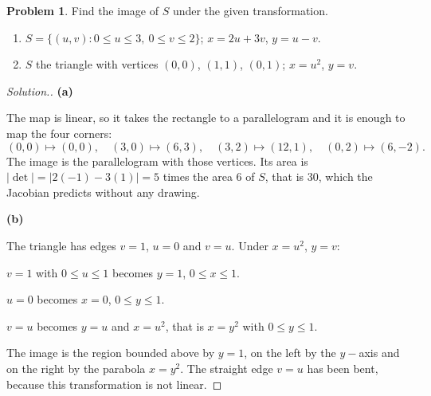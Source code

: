 \documentclass[11pt,a4paper]{article}
\theoremstyle{definition}
\newtheorem{problemx}{Problem}[subsection]
\newenvironment{problem}{\begin{problemx}}{\end{problemx}}
\newenvironment{solution}
  {\renewcommand{\qedsymbol}{}\begin{proof}[\textit{Solution}.]}
  {\end{proof}}
\newcommand{\subhead}[1]{%
  \par\medskip\noindent\textbf{#1}\par\nobreak\smallskip}
\begin{document}
\begin{problem}
Find the image of $S$ under the given transformation.
\begin{enumerate}
\item[(a)] $S = \{(u,v): 0\leq u\leq 3,\ 0\leq v\leq 2\}$;
$x = 2u+3v$, $y = u-v$.
\item[(b)] $S$ the triangle with vertices $(0,0)$, $(1,1)$, $(0,1)$;
$x = u^2$, $y = v$.
\end{enumerate}
\end{problem}
\begin{solution}
\subhead{(a)}
The map is linear, so it takes the rectangle to a parallelogram and it is enough
to map the four corners:
$$(0,0)\mapsto(0,0),\quad (3,0)\mapsto(6,3),\quad
(3,2)\mapsto(12,1),\quad (0,2)\mapsto(6,-2).$$
The image is the parallelogram with those vertices. Its area is
$\left|\det\right| = \left|2(-1)-3(1)\right| = 5$ times the area $6$ of $S$,
that is $30$, which the Jacobian predicts without any drawing.

\subhead{(b)}
The triangle has edges $v=1$, $u=0$ and $v=u$. Under $x = u^2$, $y = v$:

$v=1$ with $0\leq u\leq 1$ becomes $y=1$, $0\leq x\leq 1$.

$u=0$ becomes $x=0$, $0\leq y\leq 1$.

$v=u$ becomes $y = u$ and $x = u^2$, that is $x = y^2$ with $0\leq y\leq 1$.

The image is the region bounded above by $y=1$, on the left by the $y-$axis and
on the right by the parabola $x = y^2$. The straight edge $v=u$ has been bent,
because this transformation is not linear.
\end{solution}
\end{document}
